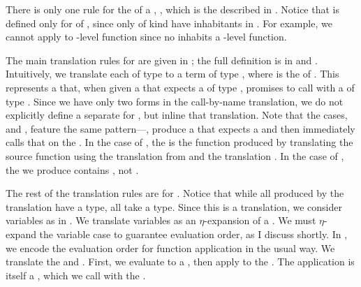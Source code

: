 There is only one rule for the  of a ,
, which is the 
described in .
Notice that  is defined only for  of 
\im{\sstarty}, since only  of kind \im{\sstarty} have inhabitants in
\cpsslang.
For example, we cannot apply  to -level function since no
 inhabits a -level function.

\FigCBNTermsShort[h!]
The main \cbnname{} translation rules for  are given in
; the full definition is in
  and
.
Intuitively, we translate each  \im{\se} of type \im{\sA} to a term
\im{\cpse} of type
\im{\cpspity{\cpsalpha}{\cpsstarty}{\cpsfunty{(\cpsfunty{\cpsA}{\cpsalpha})}{\cpsalpha}}},
where \im{\cpsA} is the  of \im{\sA}.
This  represents a  that, when given a
 \im{\cpsk} that expects a  of type \im{\cpsA},
promises to call \im{\cpsk} with a  of type \im{\cpsA}.
Since we have only two  forms in the call-by-name translation, we do
not explicitly define a separate  for , but
inline that translation.
Note that the  cases,  and , feature the same
pattern---\ie, produce a 
\im{\cpsnfune{\cpsalpha}{\cpsnfune{\cpsk}{\cpsappe{\cpsk}{\cpsv}}}} that expects
a  and then immediately calls that  on the
 \im{\cpsv}.
In the case of , the  \im{\cpsv} is the function
\im{\cpsfune{\cpsx}{\cpsA}{\cpse}} produced by translating the source function
\im{\sfune{\sx}{\sA}{\se}} using the   translation from
\im{\sA \cbnsymAdiv \cpsA} and the   translation
\im{\se \cbnsyme \cpse}.
In the case of , the  we produce
\im{\cpspaire{\cpseone}{\cpsetwo}} contains , not
.

The rest of the  translation rules are for .
Notice that while all  produced by the  translation have
a  type, all  take a  type.
Since this is a  translation, we consider variables as
 in .
We translate  variables as an \(\eta\)-expansion of a 
.
We must \(\eta\)-expand the variable case to guarantee  evaluation
order, as I discuss shortly.
In , we encode the  evaluation order for function
application \im{\sappe{\se}{\sepr}} in the usual way.
We translate the  \im{\se \cbnsyme \cpse} and \im{\sepr
  \cbnsyme \cpsepr}.
First, we evaluate \im{\cpse} to a  \im{\cpsf}, then apply
\im{\cpsf} to the \emph{} \im{\cpsepr}.
The application \im{\cpsappe{\cpsf}{\cpsepr}} is itself a ,
which we call with the  \im{\cpsk}.

